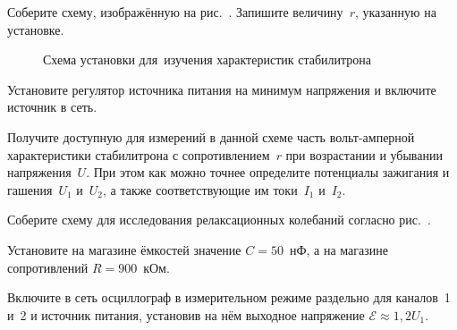 \begin{lab:task}



		\item Соберите схему, изображённую на рис.~. 
        Запишите величину~$r$, указанную на установке.


\begin{figure}[h!]
    \centering
    \caption{Схема установки для~изучения характеристик стабилитрона}
\end{figure}

		\item Установите регулятор источника питания на минимум напряжения и
включите источник в сеть.

		\item Получите доступную для измерений в данной схеме
        часть вольт-амперной характеристики стабилитрона с
сопротивлением~$r$ при возрастании и убывании напряжения~$U$. 
При этом как можно точнее определите потенциалы зажигания 
и гашения~$U_1$ и~$U_2$, а также соответствующие им токи~$I_1$ и~$I_2$.


		\item Соберите схему для исследования релаксационных колебаний 
        согласно рис.~.

		\item Установите на магазине ёмкостей значение $C=50$~нФ, а на
магазине сопротивлений $R=900$~кОм.

		\item Включите в сеть осциллограф в измерительном режиме
        раздельно для каналов~1 и~2 и источник питания, установив
        на нём выходное напряжение $\mathcal{E}\approx 1,2U_1$.



\end{lab:task}
